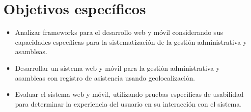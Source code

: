 \section{Objetivos específicos}\label{sec:objetivos-especificos}
\begin{itemize}
    \item Analizar frameworks para el desarrollo web y móvil considerando sus capacidades específicas para la sistematización de la gestión administrativa y asambleas.
    \item Desarrollar un sistema web y móvil para la gestión administrativa y asambleas con registro de asistencia usando geolocalización.
    \item Evaluar el sistema web y móvil, utilizando pruebas específicas de usabilidad para determinar la experiencia del usuario en su interacción con el sistema.
\end{itemize}